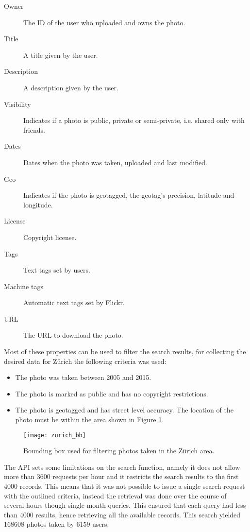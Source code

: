 \begin{description}
  \item[Owner] The ID of the user who uploaded and owns the photo.
  \item[Title] A title given by the user.
  \item[Description] A description given by the user.
  \item[Visibility] Indicates if a photo is public, private or semi-private, i.e. shared only with friends.
  \item[Dates] Dates when the photo was taken, uploaded and last modified.
  \item[Geo] Indicates if the photo is geotagged, the geotag's precision, latitude and longitude.
  \item[License] Copyright license.
  \item[Tags] Text tags set by users.
  \item[Machine tags] Automatic text tags set by Flickr.
  \item[URL] The URL to download the photo. 
\end{description}

Most of these properties can be used to filter the search results, for collecting the desired data for Zürich the following criteria was used:

\begin{itemize}
  \item The photo was taken between 2005 and 2015.
  \item The photo is marked as public and has no copyright restrictions.
  \item The photo is geotagged and has street level accuracy. The location of the photo must be within the area shown in Figure \ref{fig:zurich_bb}.
\end{itemize}

\begin{figure}
  \centering
  \texttt{[image: zurich\_bb]}
  \caption{Bounding box used for filtering photos taken in the Zürich area.}
  \label{fig:zurich_bb}
\end{figure}

The API sets some limitations on the search function, namely it does not allow more than 3600 requests per hour and it restricts the search results to the first 4000 records. This means that it was not possible to issue a single search request with the outlined criteria, instead the retrieval was done over the course of several hours though single month queries. This ensured that each query had less than 4000 results, hence retrieving all the available records. This search yielded 168608 photos taken by 6159 users.

